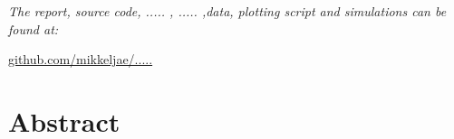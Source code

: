 \vspace{1.2cm}
  \begin{center}
    \textsl{The report, source code, ..... , ..... ,data, plotting script and simulations can be found at:}  
    \end{center}
    \vspace{-5pt}
    \begin{center}
	\renewcommand{\UrlFont}{\color{black}\normalsize\tt}
    \url{github.com/mikkeljae/.....}
   \end{center}
\newpage

\section*{Abstract}
\lipsum[5]